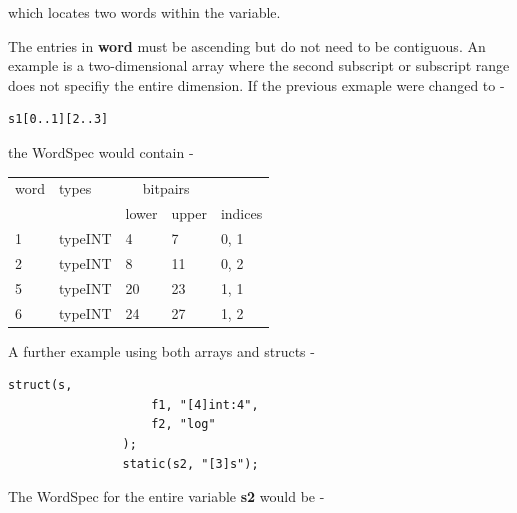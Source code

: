             which locates two words within the variable.
           
            The entries in {\bf word} must be ascending but do not
            need to be contiguous. An example is a two-dimensional array where
            the second subscript or subscript range does not specifiy the
            entire dimension. If the previous exmaple were changed to -

            \begin{lstlisting}[gobble=12, language=threepl]
             s1[0..1][2..3]
            \end{lstlisting}
            the WordSpec would contain -
            
            \begin{tabular}{| l || l || l l | l |}
            \hline
            word  & types    & \multicolumn{2}{c|}{bitpairs} & \\
                  &          & lower & upper & indices \\
            \hline \hline
             1    & typeINT  & 4     & 7     & 0, 1  \\ \hline
             2    & typeINT  & 8     & 11    & 0, 2  \\ \hline
             5    & typeINT  & 20    & 23    & 1, 1  \\ \hline
             6    & typeINT  & 24    & 27    & 1, 2  \\ \hline
            \end{tabular}

            A further example using both arrays and structs -
            \begin{lstlisting}[gobble=12, language=threepl]
                struct(s,
                    f1, "[4]int:4",
                    f2, "log"
                );
                static(s2, "[3]s");
            \end{lstlisting}
            The WordSpec for the entire variable {\bf s2} would be -

